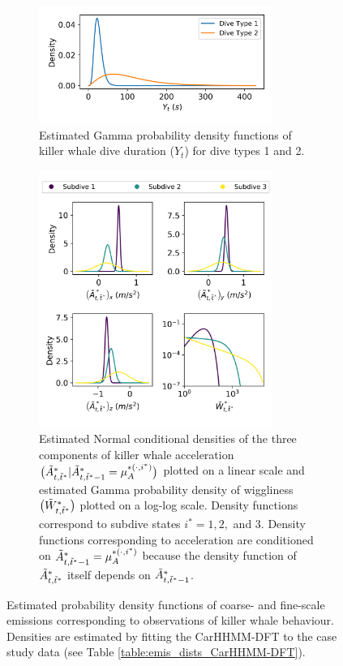 \begin{figure}[ht]
    \begin{subfigure}{\textwidth}
    	\centering
    	\includegraphics[width=3in]{../Plots/CarHHMM2-coarse-emissions.png}
    	\caption{Estimated Gamma probability density functions of killer whale dive duration ($Y_t$) for dive types 1 and 2.}
    	\label{fig:coarse_emis}
    \end{subfigure}
    \newline
    \begin{subfigure}{\textwidth}
    	\centering
    	\includegraphics[width=3in]{../Plots/CarHHMM2-fine-emissions.png}
    	\caption{Estimated Normal conditional densities of the three components of killer whale acceleration $\big(\tilde{A}^*_{t,\tilde t^*}|\tilde{A}^*_{t,\tilde t^*-1} = \mu_A^{*(\cdot,i^*)}\big)$ plotted on a linear scale and estimated Gamma probability density of wiggliness $\big(\tilde{W}^*_{t,\tilde t^*}\big)$ plotted on a log-log scale. Density functions correspond to subdive states $i^* = 1,2,$ and $3$. Density functions corresponding to acceleration are conditioned on $\tilde{A}^*_{t,\tilde t^*-1} = \mu_A^{*(\cdot,i^*)}$ because the density function of $\tilde{A}^*_{t,\tilde t^*}$ itself depends on $\tilde{A}^*_{t,\tilde t^*-1}$.}
    	\label{fig:fine_emis}
    \end{subfigure}
    \caption{Estimated probability density functions of coarse- and fine-scale emissions corresponding to observations of killer whale behaviour. Densities are estimated by fitting the CarHHMM-DFT to the case study data (see Table \ref{table:emis_dists_CarHHMM-DFT}).}
    \label{fig:emis}
\end{figure}

